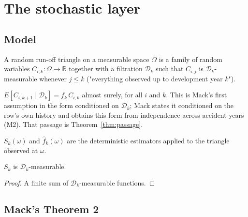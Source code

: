\chapter{The stochastic layer}

\section{Model}

\begin{definition}\label{def:RandomTriangle}\leanok
A random run-off triangle on a measurable space $\Omega$ is a family of random variables
$C_{i,k} : \Omega \to \mathbb{R}$ together with a filtration $\mathcal{D}_k$ such that $C_{i,j}$
is $\mathcal{D}_k$-measurable whenever $j \le k$ ("everything observed up to development year $k$").
\end{definition}

\begin{definition}[Assumption (M1)]\label{def:Mack1}\leanok
{}
$E[C_{i,k+1} \mid \mathcal{D}_k] = f_k\, C_{i,k}$ almost surely, for all $i$ and $k$.
This is Mack's first assumption in the form conditioned on $\mathcal{D}_k$; Mack states it
conditioned on the row's own history and obtains this form from independence across accident
years (M2). That passage is Theorem~\ref{thm:passage}.
\end{definition}

\begin{definition}\label{def:rv}\leanok
{}
$S_k(\omega)$ and $\hat f_k(\omega)$ are the deterministic estimators applied to the triangle
observed at $\omega$.
\end{definition}

\begin{lemma}\label{lem:Srv_meas}\leanok
{}
$S_k$ is $\mathcal{D}_k$-measurable.
\end{lemma}
\begin{proof}\leanok A finite sum of $\mathcal{D}_k$-measurable functions. \end{proof}

\section{Mack's Theorem 2}

